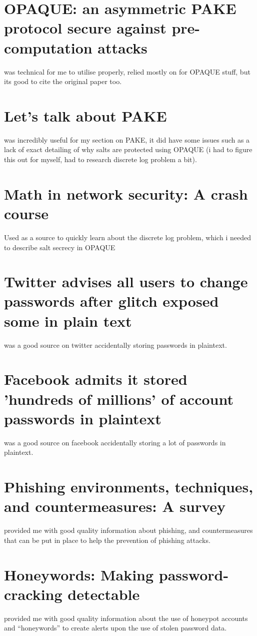\documentclass[11pt]{article}
\begin{document}
\section{OPAQUE: an asymmetric PAKE protocol secure against pre-computation attacks}
\cite{jarecki2018opaque} was technical for me to utilise properly, relied mostly on \cite{green2018pake} for OPAQUE stuff, but its good to cite the original paper too.



\section{Let’s talk about PAKE}
\cite{green2018pake} was incredibly useful for my section on PAKE, it did have some issues such as a lack of exact detailing of why salts are protected using OPAQUE (i had to figure this out for myself, had to research discrete log problem a bit).



\section{Math in network security: A crash course}
Used \cite{dong2016math} as a source to quickly learn about the discrete log problem, which i needed to describe salt secrecy in OPAQUE



\section{Twitter advises all users to change passwords after glitch exposed some in plain text}
\cite{heeti2018twitter} was a good source on twitter accidentally storing passwords in plaintext.



\section{Facebook admits it stored 'hundreds of millions' of account passwords in plaintext}
\cite{whittaker2019facebook} was a good source on facebook accidentally storing a lot of passwords in plaintext.



\section{Phishing environments, techniques, and countermeasures: A survey}
\cite{aleroud2017phishing} provided me with good quality information about phishing, and countermeasures that can be put in place to help the prevention of phishing attacks.



\section{Honeywords: Making password-cracking detectable}
\cite{juels2013honeywords} provided me with good quality information about the use of honeypot accounts and ``honeywords'' to create alerts upon the use of stolen password data.





\end{document}
